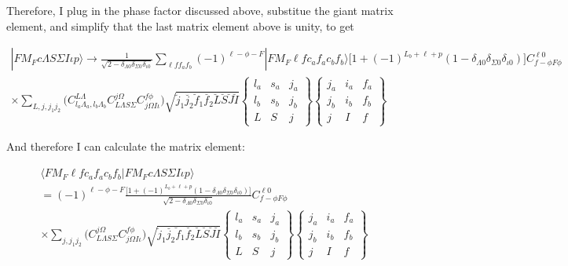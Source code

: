 \documentclass[prl, longbibliography, aps, 10pt]{revtex4-2}
\begin{document}
Therefore, I plug in the phase factor discussed above, substitue the giant matrix element, and simplify that the last matrix element above is unity, to get

\begin{equation}
\begin{split}
|F M_F c \Lambda S \Sigma I \iota p\rangle \rightarrow \frac{1}{\sqrt{2-\delta_{\Lambda 0}\delta_{\Sigma 0} \delta_{\iota 0}}} \sum_{\ell f f_a f_b}(-1)^{\ell-\phi-F}
|F M_F \ell f c_a f_a c_b f_b\rangle
\Big[1+(-1)^{L_b+\ell+p}(1-\delta_{\Lambda 0}\delta_{\Sigma 0} \delta_{\iota 0})\Big]
C_{f -\phi F \phi}^{\ell 0} \\
\times\sum_{L, j, j_1 j_2} 
\bigg(
C^{L\Lambda}_{l_a \Lambda_a, l_b \Lambda_b} 
C_{L\Lambda S\Sigma}^{j\Omega} 
C_{j\Omega I \iota}^{f \phi}
\bigg)
\sqrt{\breve{j}_1\breve{j_2}\breve{f}_1\breve{f_2}
\breve{L}\breve{S}\breve{J}\breve{I}}
\begin{Bmatrix}
l_a & s_a & j_a\\
l_b & s_b & j_b\\
L & S & j
\end{Bmatrix}
\begin{Bmatrix}
j_a & i_a & f_a\\
j_b & i_b & f_b\\
j & I & f
\end{Bmatrix}
\end{split}
\end{equation}

And therefore I can calculate the matrix element:

\begin{equation}
\begin{split}
\langle F M_F \ell f c_a f_a c_b f_b |F M_F c \Lambda S \Sigma I \iota p\rangle
\\
= 
(-1)^{\ell-\phi-F}
\frac{\Big[1+(-1)^{L_b+\ell+p}(1-\delta_{\Lambda 0}\delta_{\Sigma 0} \delta_{\iota 0})\Big]}
{\sqrt{2-\delta_{\Lambda 0}\delta_{\Sigma 0} \delta_{\iota 0}}} 
C_{f -\phi F \phi}^{\ell 0} 
\\
\times\sum_{j, j_1 j_2} 
\bigg(
C_{L\Lambda S\Sigma}^{j\Omega} 
C_{j\Omega I \iota}^{f \phi}
\bigg)
\sqrt{\breve{j}_1\breve{j_2}\breve{f}_1\breve{f_2}
\breve{L}\breve{S}\breve{J}\breve{I}}
\begin{Bmatrix}
l_a & s_a & j_a\\
l_b & s_b & j_b\\
L & S & j
\end{Bmatrix}
\begin{Bmatrix}
j_a & i_a & f_a\\
j_b & i_b & f_b\\
j & I & f
\end{Bmatrix}
\end{split}
\end{equation}
\end{document}
